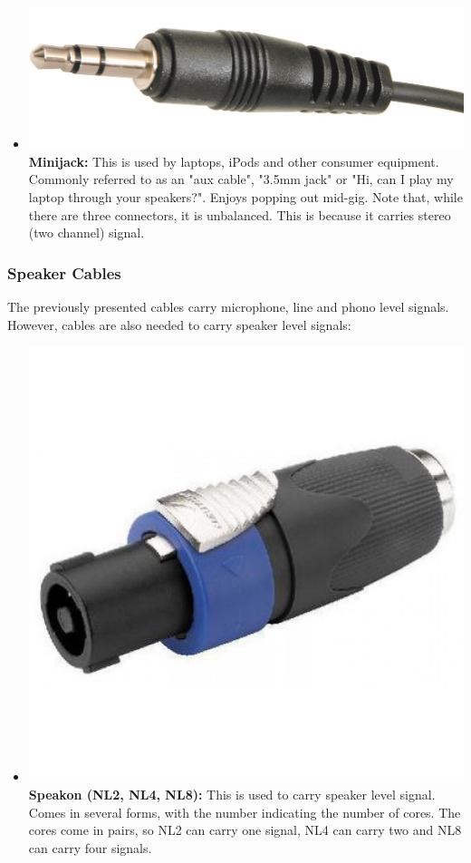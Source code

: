 \documentclass[14pt,twocolumn]{extarticle} %
\begin{document}
\begin{itemize}
\item \includegraphics[scale=0.2]{minijack2.jpg}\textbf{Minijack:} This is used by laptops, iPods and other consumer equipment. Commonly referred to as an "aux cable", "3.5mm jack" or "Hi, can I play my laptop through your speakers?". Enjoys popping out mid-gig. Note that, while there are three connectors, it is unbalanced. This is because it carries stereo (two channel) signal. 

\end{itemize}

\subsubsection{Speaker Cables}
\label{speaker-cables} 
The previously presented cables carry microphone, line and phono level signals. However, cables are also needed to carry speaker level signals:

\begin{itemize}

\item \includegraphics[scale=0.16]{nl2.jpg}\textbf{Speakon (NL2, NL4, NL8):} This is used to carry speaker level signal. Comes in several forms, with the number indicating the number of cores. The cores come in pairs, so NL2 can carry one signal, NL4 can carry two and NL8 can carry four signals.

\end{itemize}
\end{document}

